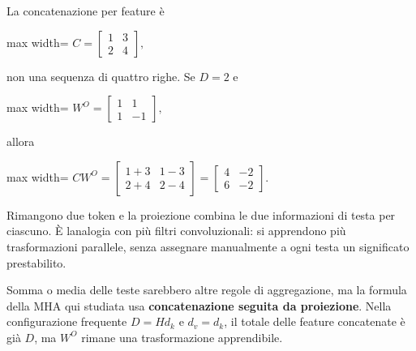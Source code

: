 \documentclass[11pt,a4paper,oneside,openany]{book}
\begin{document}
La concatenazione per feature è

\begin{center}
\begin{adjustbox}{max width=\linewidth}
$\displaystyle C=\begin{bmatrix}1&3\\2&4\end{bmatrix},$
\end{adjustbox}
\end{center}

non una sequenza di quattro righe. Se \(D=2\) e

\begin{center}
\begin{adjustbox}{max width=\linewidth}
$\displaystyle W^O=\begin{bmatrix}1&1\\1&-1\end{bmatrix},$
\end{adjustbox}
\end{center}

allora

\begin{center}
\begin{adjustbox}{max width=\linewidth}
$\displaystyle CW^O=\begin{bmatrix}1+3&1-3\\2+4&2-4\end{bmatrix}
=\boxed{\begin{bmatrix}4&-2\\6&-2\end{bmatrix}}.$
\end{adjustbox}
\end{center}

Rimangono due token e la proiezione combina le due informazioni di testa per ciascuno. È l\textquotesingle analogia con più filtri convoluzionali: si apprendono più trasformazioni parallele, senza assegnare manualmente a ogni testa un significato prestabilito.

Somma o media delle teste sarebbero altre regole di aggregazione, ma la formula della MHA qui studiata usa \textbf{concatenazione seguita da proiezione}. Nella configurazione frequente \(D=Hd_k\) e \(d_v=d_k\), il totale delle feature concatenate è già \(D\), ma \(W^O\) rimane una trasformazione apprendibile.
\end{document}
